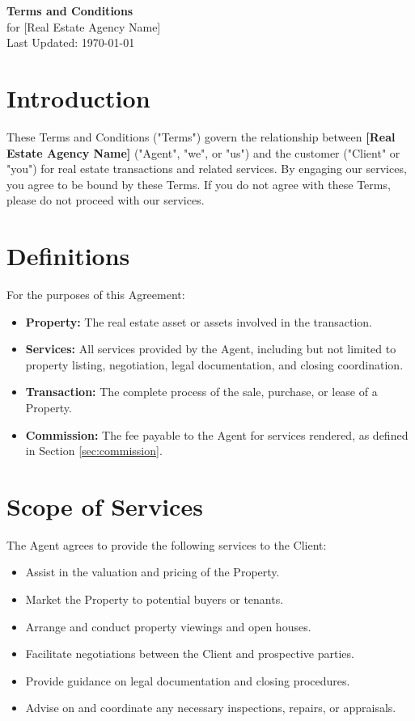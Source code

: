\documentclass[12pt]{article}
\begin{document}
\begin{center}
    {\LARGE \textbf{Terms and Conditions}}\\[0.3cm]
    {\large for [Real Estate Agency Name]}\\[0.2cm]
    {\footnotesize Last Updated: \today}
\end{center}

\vspace{1cm}

\section{Introduction}
These Terms and Conditions ("Terms") govern the relationship between \textbf{[Real Estate Agency Name]} ("Agent", "we", or "us") and the customer ("Client" or "you") for real estate transactions and related services. By engaging our services, you agree to be bound by these Terms. If you do not agree with these Terms, please do not proceed with our services.

\section{Definitions}
For the purposes of this Agreement:
\begin{itemize}[leftmargin=1.5cm]
    \item \textbf{Property:} The real estate asset or assets involved in the transaction.
    \item \textbf{Services:} All services provided by the Agent, including but not limited to property listing, negotiation, legal documentation, and closing coordination.
    \item \textbf{Transaction:} The complete process of the sale, purchase, or lease of a Property.
    \item \textbf{Commission:} The fee payable to the Agent for services rendered, as defined in Section \ref{sec:commission}.
\end{itemize}

\section{Scope of Services}
The Agent agrees to provide the following services to the Client:
\begin{itemize}[leftmargin=1.5cm]
    \item Assist in the valuation and pricing of the Property.
    \item Market the Property to potential buyers or tenants.
    \item Arrange and conduct property viewings and open houses.
    \item Facilitate negotiations between the Client and prospective parties.
    \item Provide guidance on legal documentation and closing procedures.
    \item Advise on and coordinate any necessary inspections, repairs, or appraisals.
\end{itemize}
\end{document}
